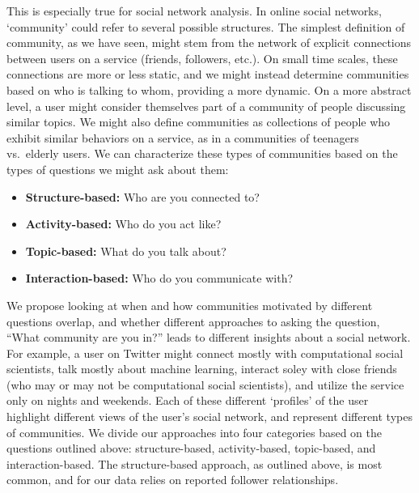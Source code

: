 This is especially true for social network analysis. In online social networks, `community' could refer to several possible structures. The simplest definition of community, as we have seen, might stem from the network of explicit connections between users on a service (friends, followers, etc.). On small time scales, these connections are more or less static, and we might instead determine communities based on who is talking to whom, providing a more dynamic. On a more abstract level, a user might consider themselves part of a community of people discussing similar topics. We might also define communities as collections of people who exhibit similar behaviors on a service, as in a communities of teenagers vs.\ elderly users. We can characterize these types of communities based on the types of questions we might ask about them:
\begin{itemize}
	\item \textbf{Structure-based:} Who are you connected to?
	\item \textbf{Activity-based:} Who do you act like?
	\item \textbf{Topic-based:} What do you talk about?
	\item \textbf{Interaction-based:} Who do you communicate with?
\end{itemize}

We propose looking at when and how communities motivated by different questions overlap, and whether different approaches to asking the question, ``What community are you in?'' leads to different insights about a social network. For example, a user on Twitter might connect mostly with computational social scientists, talk mostly about machine learning, interact soley with close friends (who may or may not be computational social scientists), and utilize the service only on nights and weekends. Each of these different `profiles' of the user highlight different views of the user's social network, and represent different types of communities. We divide our approaches into four categories based on the questions outlined above: structure-based, activity-based, topic-based, and interaction-based. The structure-based approach, as outlined above, is most common, and for our data relies on reported follower relationships.

